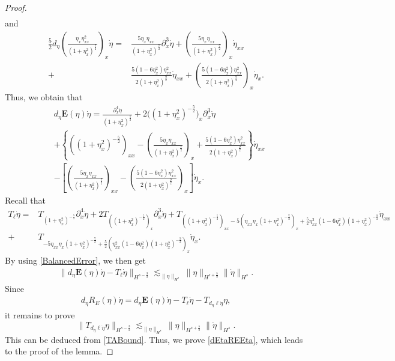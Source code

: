 \documentclass[12pt]{amsart}
\theoremstyle{definition}
\numberwithin{equation}{section}
\newcommand{\p}{\partial}
\newcommand{\f}{\frac}
\begin{document}
\begin{proof}
\begin{align*}
\end{align*}
and
\begin{align*}
\f52d_{\eta}\left(\f{\eta_x\eta_{xx}^2}{(1+\eta^2_x)^{\f72}}\right)_x\dot{\eta}
=&\f{5\eta_x\eta_{xx}}{(1+\eta_x^2)^{\f72}}\p^3_{x}\dot{\eta}+\left(\f{5\eta_x\eta_{xx}}{(1+\eta_x^2)^{\f72}}\right)_x\dot{\eta}_{xx}\\
+&\f{5(1-6\eta_x^2)\eta^2_{xx}}{2(1+\eta_x^2)^{\f92}}\dot{\eta}_{xx}+\left(\f{5(1-6\eta_x^2)\eta^2_{xx}}{2(1+\eta_x^2)^{\f92}}\right)_x\dot{\eta}_{x}.
\end{align*}
Thus, we obtain that
\begin{align*}
&d_{\eta}\mathbf{E}(\eta)\dot{\eta}=
\f{\p_x^4\dot{\eta}}{(1+\eta^2_x)^{\f52}}+2\big((1+\eta^2_x)^{-\f52}\big)_x\p^3_x\dot{\eta}\\
&+\left\{((1+\eta^2_x)^{-\f52})_{xx}-\left(\f{5\eta_x\eta_{xx}}{(1+\eta_x^2)^{\f72}}\right)_x+\f{5(1-6\eta_x^2)\eta^2_{xx}}{2(1+\eta_x^2)^{\f92}}\right\}\dot{\eta}_{xx}\\
&-\left[\left(\f{5\eta_x\eta_{xx}}{(1+\eta_x^2)^{\f72}}\right)_{xx}-\left(\f{5(1-6\eta_x^2)\eta^2_{xx}}{2(1+\eta_x^2)^{\f92}}\right)_x\right]\dot{\eta}_{x}.
\end{align*}
Recall that
\begin{align*}
   T_{\ell}\dot{\eta} =&T_{(1+\eta_x^2)^{-\f52}} \p_x^4\dot{\eta} + 2T_{((1+\eta_x^2)^{-\f52})_x} \p_x^3\dot{\eta}+ T_{((1+\eta_x^2)^{-\f52})_{xx}-5(\eta_{xx}\eta_x(1+\eta_x^2)^{-\f72})_x+\f52\eta_{xx}^2(1-6\eta_x^2)(1+\eta_x^2)^{-\f92}} \dot{\eta}_{xx}\\
+&T_{-5\eta_{xx}\eta_x(1+\eta_x^2)^{-\f72}+\f52(\eta_{xx}^2(1-6\eta_x^2)(1+\eta_x^2)^{-\f92})_x} \dot{\eta}_x.
\end{align*}
By using \eqref{BalancedError}, we then get
\begin{align*}
\|d_{\eta}\mathbf{E}(\eta)\dot{\eta}-T_{\ell}\dot{\eta}\|_{H^{s-\f32}}\lesssim_{\|\eta\|_{H^s}}   \|\eta\|_{H^{s+\f52}} \| \dot{\eta}\|_{H^s}.
\end{align*}
Since 
\begin{align*}
d_{\eta}R_E(\eta)\dot{\eta}=d_{\eta}\mathbf{E}(\eta)\dot{\eta}-T_{\ell}\dot{\eta}-T_{d_{\eta}\ell\dot{\eta}}\eta,
\end{align*}
it remains to prove
\begin{equation} \label{tdEtaEllEtaEta}
\|T_{d_{\eta}\ell\dot{\eta}}\eta\|_{H^{s-\f32}}\lesssim_{\|\eta\|_{H^s}} \|\eta\|_{H^{s+\f52}} \| \dot{\eta}\|_{H^s}.
\end{equation}
This can be deduced from \eqref{TABound}. Thus, we prove \eqref{dEtaREEta}, which leads to the proof of the lemma.
\end{proof}
\end{document}
